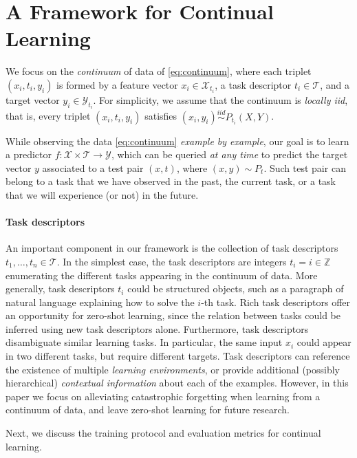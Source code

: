 \documentclass{article}
\newcommand{\X}{\mathcal{X}}
\newcommand{\Y}{\mathcal{Y}}
\newcommand{\T}{\mathcal{T}}
\begin{document}
\section{A Framework for Continual Learning}\label{sec:continuum}
We focus on the \emph{continuum} of data of
\eqref{eq:continuum}, where each triplet $(x_i, t_i, y_i)$ is formed by a
feature vector $x_i \in \X_{t_i}$, a task descriptor $t_i \in \T$, and a target
vector $y_i \in \Y_{t_i}$. For simplicity, we assume that the continuum is
\emph{locally iid}, that is, every triplet $(x_i, t_i, y_i)$ satisfies $(x_i,
y_i) \stackrel{iid}{\sim} P_{t_i}(X, Y)$.

While observing the data \eqref{eq:continuum} \emph{example by example}, our
goal is to learn a predictor $f : \X \times \T \to \Y$, which can be queried
\emph{at any time} to predict the target vector $y$ associated to a test pair
$(x, t)$, where $(x,y) \sim P_t$. Such test pair can belong to a task that we
have observed in the past, the current task, or a task that we will experience
(or not) in the future.

\paragraph{Task descriptors} An important component in our framework is the
collection of task descriptors $t_1, \ldots, t_n \in \mathcal{T}$. In the
simplest case, the task descriptors are integers $t_i = i \in \mathbb{Z}$
enumerating the different tasks appearing in the continuum of data.  More
generally, task descriptors $t_i$ could be structured objects, such as a
paragraph of natural language explaining how to solve the $i$-th task. Rich
task descriptors offer an opportunity for zero-shot learning, since the
relation between tasks could be inferred using new task descriptors alone.
Furthermore, task descriptors disambiguate similar learning tasks.  In
particular, the same input $x_i$ could appear in two different tasks, but
require different targets. Task descriptors can reference the existence of
multiple \emph{learning environments}, or provide additional (possibly
hierarchical) \emph{contextual information} about each of the examples.
However, in this paper we focus on alleviating catastrophic forgetting when
learning from a continuum of data, and leave zero-shot learning for future
research.

Next, we discuss the training protocol and evaluation metrics for continual
learning.
\end{document}
